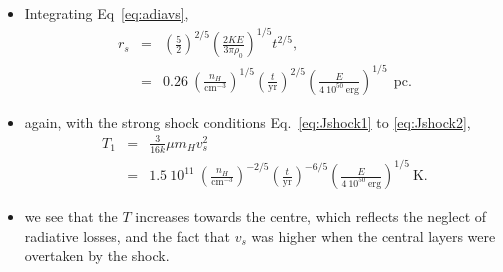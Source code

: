 \begin{frame}{}

\begin{itemize}

\item Integrating Eq~\ref{eq:adiavs}, 
\begin{eqnarray}
r_s  &  =  &  \left( \frac{5}{2} \right)^{2/5} \left( \frac{2KE}{3\pi
  \rho_0}  \right)^{1/5} t^{2/5} , \nonumber \\ 
     &  =  & 0.26 ~ \left( \frac{n_H}{\mathrm{cm}^{-3}}
\right)^{1/5} \left( \frac{t}{\mathrm{yr}} \right) ^{2/5} \left(
\frac{E}{4~10^{50}~\mathrm{erg}} \right)^{1/5} ~~\mathrm{pc}.  \nonumber
\end{eqnarray}

\item again, with the strong shock conditions Eq.~\ref{eq:Jshock1} to  \ref{eq:Jshock2},
\begin{eqnarray}
T_1  & =  & \frac{3}{16k} \mu m_H v_s^2   \label{eq:Tshock} \\
   & =  & 1.5~10^{11}~\left(
\frac{n_H}{\mathrm{cm}^{-3}} \right)^{-2/5} \left(
  \frac{t}{\mathrm{yr}}  \right)^{-6/5} \left(
  \frac{E}{4~10^{50}~\mathrm{erg}} \right)^{1/5} ~\mathrm{K}.  \nonumber
\end{eqnarray}
\item we see that the $T$ increases towards the centre, which reflects
  the neglect of radiative losses, and the fact that $v_s$ was higher
  when the central layers were overtaken by the shock.

\end{itemize}
\end{frame}





